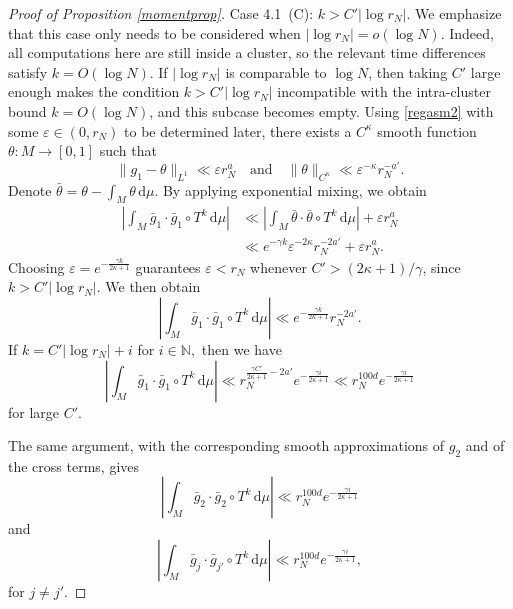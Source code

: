 \documentclass[11pt,twoside,a4paper,reqno]{amsart}
\renewcommand{\d}{\, \text{d}}
\begin{document}
\begin{proof}[Proof of Proposition \ref{momentprop}]
Case 4.1~(C): $k> C' \left|\log r_N\right|.$ We emphasize that this case only needs to be considered when $|\log r_N|=o(\log N)$. Indeed, all computations here are still inside a cluster, so the relevant time differences satisfy $k=O(\log N)$. If $|\log r_N|$ is comparable to $\log N$, then taking $C'$ large enough makes the condition $k>C'|\log r_N|$ incompatible with the intra-cluster bound $k=O(\log N)$, and this subcase becomes empty. Using \eqref{regasm2} with some $\varepsilon\in (0,r_N)$ to be determined later, there exists a $C^{\kappa}$ smooth function $\theta:M\rightarrow[0,1]$ such that
\begin{equation*}
\|g_1-\theta\|_{L^1} \ll\varepsilon r_N^a \quad \text{and} \quad \|\theta\|_{C^{\kappa}} \ll\varepsilon^{-\kappa} r_N^{-a'}.
\end{equation*}
Denote $\bar{\theta}=\theta - \int_M \theta\d\mu$. By applying exponential mixing, we obtain
\begin{align*}
\left| \int_M \bar{g}_{1} \cdot \bar{g}_{1} \circ T^{k} \d\mu \right| &\ll \left| \int_M \bar{\theta} \cdot \bar{\theta} \circ T^{k} \d\mu \right| + \varepsilon r_N^{a} \\
& \ll e^{-\gamma k} \varepsilon^{-2\kappa} r_N^{-2a'} +\varepsilon r_N^a.
\end{align*}
Choosing $\varepsilon=e^{-\frac{\gamma k}{2\kappa+1}}$ guarantees $\varepsilon<r_N$ whenever $C'>(2\kappa+1)/\gamma$, since $k>C'\left|\log r_N\right|$. We then obtain
\begin{equation*}
\left| \int_M \bar{g}_{1} \cdot \bar{g}_{1} \circ T^{k} \d\mu \right| \ll e^{-\frac{\gamma k}{2\kappa+1}} r_N^{-2a'}.
\end{equation*}
If $k=C'|\log r_N| + i$ for $i\in\mathbb{N},$ then we have
\begin{equation*}
\left| \int_M \bar{g}_{1} \cdot \bar{g}_{1} \circ T^{k} \d\mu \right| \ll r_N^{\frac{\gamma C'}{2\kappa+1}-2a'}e^{-\frac{\gamma i}{2\kappa+1}}\ll r_N^{100d} e^{-\frac{\gamma i}{2\kappa+1}}
\end{equation*}
for large $C'$.


The same argument, with the corresponding smooth approximations of $g_2$ and of the cross terms, gives
\begin{equation*}
\left| \int_M \bar{g}_{2} \cdot \bar{g}_{2} \circ T^{k} \d\mu \right| \ll r_N^{100d} e^{-\frac{\gamma i}{2\kappa+1}}
\end{equation*}
and
\begin{equation*}
\left| \int_M \bar{g}_{j} \cdot \bar{g}_{j'} \circ T^{k} \d\mu \right| \ll r_N^{100d} e^{-\frac{\gamma i}{2\kappa+1}},
\end{equation*}
for $j\neq j'$.








\end{proof}
\end{document}
